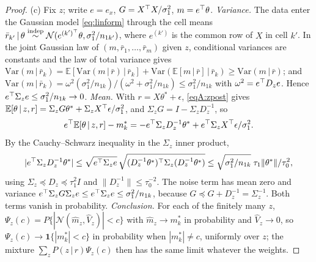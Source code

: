 \documentclass[11pt]{article}
\newcommand{\E}{\mathbb{E}}
\newcommand{\Var}{\mathrm{Var}}
\newcommand{\Normal}{\mathcal{N}}
\newcommand{\given}{\,\vert\,}
\newcommand{\indep}{\stackrel{\text{indep}}{\sim}}
\theoremstyle{definition}
\theoremstyle{plain}
\begin{document}
{\begin{proof}
(c) Fix $z$; write $e=e_x$, $G=X^{\top} X/\sigma_1^2$, $m=e^{\top}\theta$. \emph{Variance.} The data enter the Gaussian model \eqref{eq:linform} through the cell means $\bar r_{k'}\given\theta\indep\Normal(e^{(k')\tr}\theta,\sigma_1^2/n_{1k'})$, where $e^{(k')}$ is the common row of $X$ in cell $k'$. In the joint Gaussian law of $(m,\bar r_1,\dots,\bar r_m)$ given $z$, conditional variances are constants and the law of total variance gives $\Var(m\given\bar r_k)=\E[\Var(m\given\bar r)\given\bar r_k]+\Var(\E[m\given\bar r]\given\bar r_k)\ge\Var(m\given\bar r)$; and $\Var(m\given\bar r_k)=\omega^2(\sigma_1^2/n_{1k})/(\omega^2+\sigma_1^2/n_{1k})\le\sigma_1^2/n_{1k}$ with $\omega^2=e^{\top} D_ze$. Hence $e^{\top}\Sigma_ze\le\sigma_1^2/n_{1k}\to0$. \emph{Mean.} With $r=X\theta^\ast+\epsilon$, \eqref{eqA:zpost} gives $\E[\theta\given z,r]=\Sigma_zG\theta^\ast+\Sigma_zX\tr\epsilon/\sigma_1^2$, and $\Sigma_zG=I-\Sigma_zD_z^{-1}$, so
\[
e\tr\E[\theta\given z,r]-m_k^\ast=-e\tr\Sigma_zD_z^{-1}\theta^\ast+e\tr\Sigma_zX\tr\epsilon/\sigma_1^2 .
\]
By the Cauchy--Schwarz inequality in the $\Sigma_z$ inner product,
\[
|e^{\top}\Sigma_zD_z^{-1}\theta^\ast|\le\sqrt{e^{\top}\Sigma_ze}\,\sqrt{(D_z^{-1}\theta^\ast)^{\top}\Sigma_z(D_z^{-1}\theta^\ast)}\le\sqrt{\sigma_1^2/n_{1k}}\;\tau_1\|\theta^\ast\|/\tau_0^2 ,
\]
using $\Sigma_z\preceq D_z\preceq\tau_1^2I$ and $\|D_z^{-1}\|\le\tau_0^{-2}$. The noise term has mean zero and variance $e^{\top}\Sigma_zG\Sigma_ze\le e^{\top}\Sigma_ze\le\sigma_1^2/n_{1k}$, because $G\preceq G+D_z^{-1}=\Sigma_z^{-1}$. Both terms vanish in probability. \emph{Conclusion.} For each of the finitely many $z$, $\Psi_z(c)=P\{|\Normal(\hat m_z,\hat V_z)|<c\}$ with $\hat m_z\to m_k^\ast$ in probability and $\hat V_z\to0$, so $\Psi_z(c)\to\mathbf 1\{|m_k^\ast|<c\}$ in probability when $|m_k^\ast|\ne c$, uniformly over $z$; the mixture $\sum_zP(z\given r)\Psi_z(c)$ then has the same limit whatever the weights.
\end{proof}

}
\end{document}
